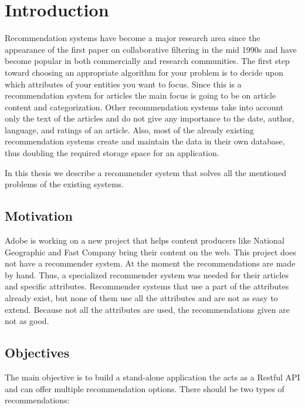\chapter{Introduction}
\label{chapter:intro}

Recommendation systems have become a major research area since the appearance of the first paper on collaborative filtering in the mid 1990s and have become popular in both commercially and research communities. The first step toward choosing an appropriate algorithm for your problem is to decide upon which attributes of your entities you want to focus. Since this is a recommendation system for articles the main focus is going to be on article content and categorization. Other recommendation systems take into account only the text of the articles and do not give any importance to the date, author, language, and ratings of an article. Also, most of the already existing recommendation systems create and maintain the data in their own database, thus doubling the required storage space for an application. 

In this thesis we describe a recommender system that solves all the mentioned problems of the existing systems.\\

\section{Motivation}
\label{sec:motivation}
Adobe is working on a new project that helps content producers like National Geographic and Fast Company bring their content on the web. This project does not have a recommender system. At the moment the recommendations are made by hand. Thus, a specialized recommender system was needed for their articles and specific attributes. Recommender systems that use a part of the attributes already exist, but none of them use all the attributes and are not as easy to extend. Because not all the attributes are used, the recommendations given are not as good.

\section{Objectives}
\label{sec:objectives}
The main objective is to build a stand-alone application the acts as a Restful API and can offer multiple recommendation options. There should be two types of recommendations:

